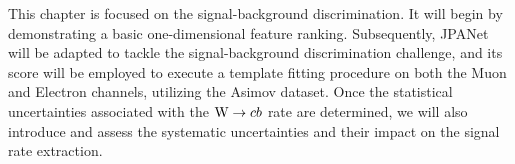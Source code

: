 \label{sec:signal}
\vspace{-1cm}
\minitoc
This chapter is focused on the signal-background discrimination. It will begin by demonstrating a basic one-dimensional feature ranking. Subsequently, JPANet will be adapted to tackle the signal-background discrimination challenge, and its score will be employed to execute a template fitting procedure on both the Muon and Electron channels, utilizing the Asimov dataset.
Once the statistical uncertainties associated with the ${\text{W}} \to cb$ rate are determined, we will also introduce and assess the systematic uncertainties and their impact on the signal rate extraction.
\\
\begin{minipage}[H]{\linewidth}
\begin{minipage}{0.35\linewidth}
        \centering

\end{minipage}
\end{minipage}
